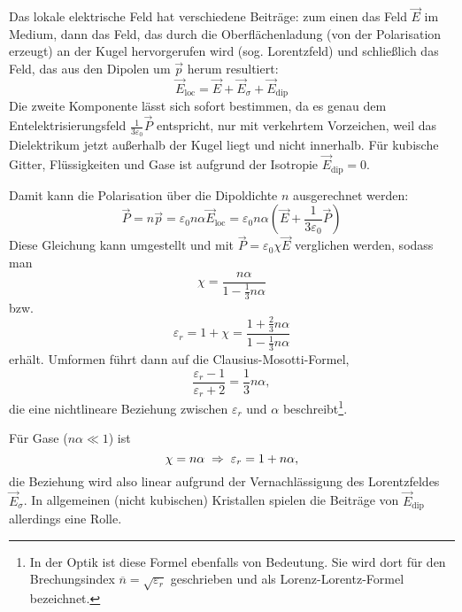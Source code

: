 Das lokale elektrische Feld hat verschiedene Beiträge: zum einen das Feld $\vec {E}$ im Medium, dann das Feld, das durch die Oberflächenladung (von der Polarisation erzeugt) an der Kugel hervorgerufen wird (sog. Lorentzfeld) und schließlich das Feld, das aus den Dipolen um $\vec {p}$ herum resultiert:
\begin{equation*}
	\vec {E}_{\mathrm{loc}}=\vec {E}+\vec {E}_{\sigma }+\vec {E}_{\mathrm{dip}}
\end{equation*}
Die zweite Komponente lässt sich sofort bestimmen, da es genau dem Entelektrisierungsfeld $\frac{1}{3\varepsilon _{0}}\vec {P}$ entspricht, nur mit verkehrtem Vorzeichen, weil das Dielektrikum jetzt außerhalb der Kugel liegt und nicht innerhalb. Für kubische Gitter, Flüssigkeiten und Gase ist aufgrund der Isotropie $\vec {E}_{\mathrm{dip}}=0$.

Damit kann die Polarisation über die Dipoldichte $n$ ausgerechnet werden:
\begin{equation*}
	\vec {P} =n\vec {p}=\varepsilon _{0}n\alpha \vec {E}_{\mathrm{loc}}=\varepsilon _{0}n\alpha \left(\vec {E}+\frac{1}{3\varepsilon _{0}}\vec {P}\right)
\end{equation*}
Diese Gleichung kann umgestellt und mit $\vec {P}=\varepsilon _{0}\chi \vec {E}$ verglichen werden, sodass man
\begin{equation*}
	\chi =\frac{n\alpha }{1-\frac{1}{3}n\alpha }
\end{equation*}
bzw.
\begin{equation*}
	\varepsilon _{r}=1+\chi =\frac{1+\frac{2}{3}n\alpha }{1-\frac{1}{3}n\alpha }
\end{equation*}
erhält. Umformen führt dann auf die Clausius-Mosotti-Formel,
\begin{equation*}
	\frac{\varepsilon _{r}-1}{\varepsilon _{r}+2}=\frac{1}{3}n\alpha ,
\end{equation*}
die eine nichtlineare Beziehung zwischen $\varepsilon _{r}$ und $\alpha $ beschreibt\footnote{In der Optik ist diese Formel ebenfalls von Bedeutung. Sie wird dort für den Brechungsindex $\overline{n}=\sqrt{\varepsilon _{r}}$ geschrieben und als Lorenz-Lorentz-Formel bezeichnet. }.

Für Gase ($n\alpha \ll 1$) ist
\begin{equation*}
	\chi =n\alpha \;\Rightarrow\; \varepsilon _{r}=1+n\alpha ,
\end{equation*}
die Beziehung wird also linear aufgrund der Vernachlässigung des Lorentzfeldes $\vec {E}_{\sigma }$. In allgemeinen (nicht kubischen) Kristallen spielen die Beiträge von $\vec {E}_{\mathrm{dip}}$ allerdings eine Rolle.

